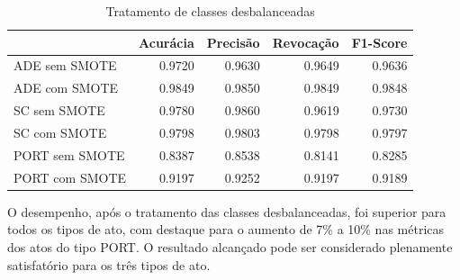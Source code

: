 \begin{table}[h]
\caption{Tratamento de classes desbalanceadas}
\label{tab:resultados-oversampling}
	\begin{center}
	\begin{tabular}{lrrrr}
		\toprule
		{} &  Acurácia &  Precisão &  Revocação &      F1-Score \\
		\midrule
		ADE sem SMOTE        &    0.9720 &    0.9630 &     0.9649 &  0.9636 \\
		ADE com SMOTE    &    0.9849 &    0.9850 &     0.9849 &  0.9848 \\
		SC sem SMOTE     &    0.9780 &    0.9860 &     0.9619 &  0.9730 \\
		SC com SMOTE &    0.9798 &    0.9803 &     0.9798 &  0.9797 \\
		PORT sem SMOTE     &    0.8387 &    0.8538 &     0.8141 &  0.8285 \\
		PORT com SMOTE &    0.9197 &    0.9252 &     0.9197 &  0.9189 \\
		\bottomrule
	\end{tabular}
	\end{center}		
\end{table}

O desempenho, após o tratamento das classes desbalanceadas, foi superior para todos os tipos de ato, com destaque para o aumento de 7\% a 10\% nas métricas dos atos do tipo PORT. O resultado alcançado pode ser considerado plenamente satisfatório para os três tipos de ato.